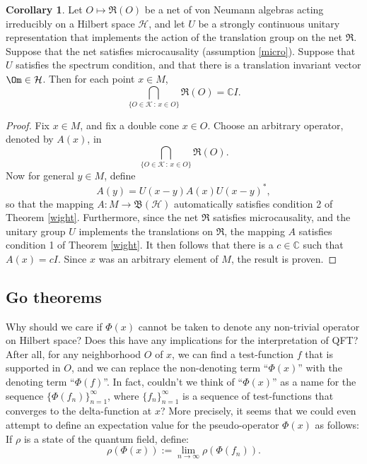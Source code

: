 \documentclass[12pt]{article}
\newcommand{\bh}{\mathfrak{B}(\mathcal{H})}
\theoremstyle{definition}
\newtheorem{cor}[thm]{Corollary}
\theoremstyle{definition}
\theoremstyle{remark}
\def\2#1{{\mathcal #1}}
\def\7#1{{\mathbb #1}}
\def\al#1{{\mathfrak #1}}
\begin{document}
\begin{cor} Let $O\mapsto \al R(O)$ be a net of von Neumann algebras acting
  irreducibly on a Hilbert space $\2H$, and let $U$ be a strongly continuous unitary
  representation that implements the action of the translation group on the net $\al
  R$.  Suppose that the net satisfies microcausality (assumption \ref{micro}).
  Suppose that $U$ satisfies the spectrum condition, and that there is a translation
  invariant vector $\Om\in \2H$.  Then for each point $x\in M$,
$$ \bigcap _{\{ O\in  \2K\,:\,x\in O \}}\al R(O) =\7C I .$$
\end{cor}

\begin{proof} Fix $x\in M$, and fix a double cone $x\in O$.  Choose an arbitrary
  operator, denoted by $A(x)$, in
$$ \bigcap _{\{ O\in  \2K\,:\,x\in O \}}\al R(O) .$$  Now for general
$y\in M$, define
$$ A(y) =U(x-y)A(x)U(x-y)^* ,$$
so that the mapping $A:M\to \bh$ automatically satisfies condition 2
of Theorem \ref{wight}.  Furthermore, since the net $\al R$ satisfies
microcausality, and the unitary group $U$ implements the translations
on $\al R$, the mapping $A$ satisfies condition 1 of Theorem
\ref{wight}.  It then follows that there is a $c\in \7C$ such that
$A(x)=cI$.  Since $x$ was an arbitrary element of $M$, the result is
proven.
\end{proof}

\subsection{Go theorems}

Why should we care if $\Phi (x)$ cannot be taken to denote any non-trivial operator
on Hilbert space?  Does this have any implications for the interpretation of QFT?
After all, for any neighborhood $O$ of $x$, we can find a test-function $f$ that is
supported in $O$, and we can replace the non-denoting term ``$\Phi (x)$'' with the
denoting term ``$\Phi (f)$''.  In fact, couldn't we think of ``$\Phi (x)$'' as a name
for the sequence $\{ \Phi (f_n ) \} _{n=1}^{\infty}$, where $\{ f_n
\}_{n=1}^{\infty}$ is a sequence of test-functions that converges to the
delta-function at $x$?  More precisely, it seems that we could even attempt to define
an expectation value for the pseudo-operator $\Phi (x)$ as follows: If $\rho$ is a
state of the quantum field, define:
\begin{equation} \rho (\Phi (x)):= \lim _{n\rightarrow \infty}\rho (\Phi (f_{n}))
  .\end{equation}
\end{document}
